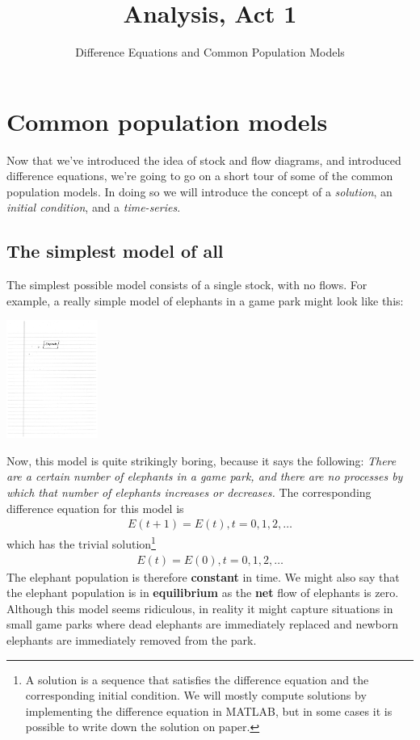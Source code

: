 \documentclass{tufte-handout}
\title{Analysis, Act 1}
\author{Difference Equations and Common Population Models}
\begin{document}
\maketitle


\section{Common population models}

Now that we've introduced the idea of stock and flow diagrams, and introduced difference equations, we're going to go on a short tour of some of the common population models. In doing so we will introduce the concept of a 
{\it solution}, 
an {\it initial condition}, and a {\it time-series}.
\subsection{The simplest model of all}

The simplest possible model consists of a single stock, with no flows.  For example, a really simple model of elephants in a game park might look like this:

\centerline{\includegraphics[width=3cm]{figs/simple_model}}

Now, this model is quite strikingly boring, because it says the following:  {\it There are a certain number of elephants in a game park, and there are no processes by which that number of elephants increases or decreases.}  The corresponding difference equation for this model is
\begin{eqnarray*}
E(t+1) = E(t), t = 0, 1, 2, \ldots
\end{eqnarray*}
which has the trivial solution\footnote{A solution is a sequence that satisfies the difference equation and the corresponding initial condition. We will mostly compute solutions by implementing the difference equation in MATLAB, but in some cases it is possible to write down the solution on paper.}
\begin{eqnarray*}
E(t) = E(0), t = 0, 1, 2, \ldots
\end{eqnarray*}
The elephant population is therefore {\bf constant} in time. We might also say that the elephant population is in {\bf equilibrium} as the {\bf net} flow of elephants is zero. Although this model seems ridiculous, in reality it might capture situations in small game parks where dead elephants are immediately replaced and newborn elephants are immediately removed from the park.
\end{document}
